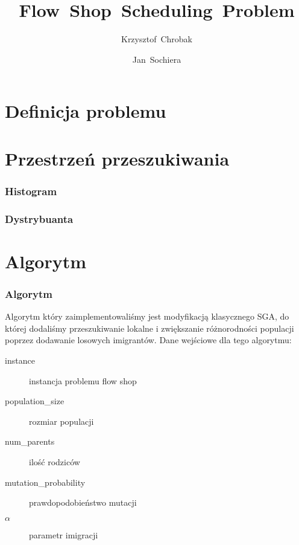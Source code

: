 \documentclass[10pt]{beamer}
\title[Flow Shop Scheduling Problem]{Flow~Shop~Scheduling~Problem}
\author[Krzysztof Chrobak\and Jan Sochiera]{Krzysztof~Chrobak \and Jan~Sochiera}
\institute[Algorytmy Ewolucyjne 2012]{\normalsize Algorytmy Ewolucyjne 2012}
\begin{document}
\frame{
\titlepage
}


\section{Definicja problemu}


\section{Przestrzeń przeszukiwania}
\frame
{
  \frametitle{Histogram}
	\begin{figure}
\begin{center}
\end{center}
\end{figure}
}


\frame
{
  \frametitle{Dystrybuanta}
\begin{figure}
\begin{center}
\end{center}
\end{figure}

	
}

\section{Algorytm}
\frame
{
  \frametitle{Algorytm}
  Algorytm który zaimplementowaliśmy jest modyfikacją klasycznego SGA, do której dodaliśmy przeszukiwanie lokalne
i zwiększanie różnorodności populacji poprzez dodawanie losowych imigrantów. Dane wejściowe dla tego algorytmu:
\begin{description}
  \item[instance] instancja problemu flow shop
  \item[population\_size] rozmiar populacji
  \item[num\_parents] ilość rodziców
  \item[mutation\_probability] prawdopodobieństwo mutacji
  \item[$\alpha$] parametr imigracji
  
\end{description}

}
\end{document}
